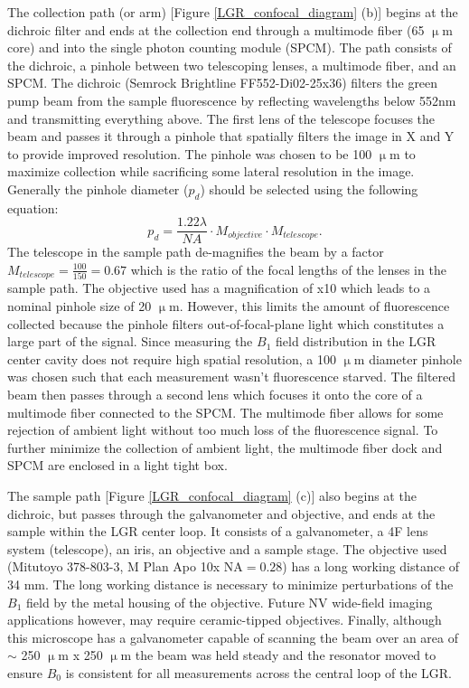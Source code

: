 The collection path (or arm) [Figure \ref{LGR_confocal_diagram} (b)] begins at the dichroic filter and ends at the collection end through a multimode fiber (65 $\upmu$m core) and into the single photon counting module (SPCM). The path consists of the dichroic, a pinhole between two telescoping lenses, a multimode fiber, and an SPCM. The dichroic (Semrock Brightline FF552-Di02-25x36) filters the green pump beam from the sample fluorescence by reflecting wavelengths below 552nm and transmitting everything above. The first lens of the telescope focuses the beam and passes it through a pinhole that spatially filters the image in X and Y to provide  improved resolution. The pinhole was chosen to be 100 $\upmu$m to maximize collection while sacrificing some lateral resolution in the image. Generally the pinhole diameter ($p_d$) should be selected using the following equation:
\begin{equation}
p_d = \frac{1.22 \lambda}{NA} \cdot M_{objective} \cdot M_{telescope}. 
\end{equation}
The telescope in the sample path de-magnifies the beam by a factor $M_{telescope} = \frac{100}{150} = 0.67$ which is the ratio of the focal lengths of the lenses in the sample path. The objective used has a magnification of x10 which leads to a nominal pinhole size of 20 $\upmu$m. However, this limits the amount of fluorescence collected because the pinhole filters out-of-focal-plane light which constitutes a large part of the signal. Since measuring the $B_1$ field distribution in the LGR center cavity does not require high spatial resolution, a 100 $\upmu$m diameter pinhole was chosen such that each measurement wasn't fluorescence starved. The filtered beam then passes through a second lens which focuses it onto the core of a multimode fiber connected to the SPCM. The multimode fiber allows for some rejection of ambient light without too much loss of the fluorescence signal. To further minimize the collection of ambient light, the multimode fiber dock and SPCM are enclosed in a light tight box. 

The sample path [Figure \ref{LGR_confocal_diagram} (c)] also begins at the dichroic, but passes through the galvanometer and objective, and ends at the sample within the LGR center loop. It consists of a galvanometer, a 4F lens system (telescope), an iris, an objective and a sample stage. The objective used (Mitutoyo 378-803-3, M Plan Apo 10x $\text{NA}=0.28$) has a long working distance of 34 mm. The long working distance is necessary to minimize perturbations of the $B_1$ field by the metal housing of the objective. Future NV wide-field imaging applications however, may require ceramic-tipped objectives. Finally, although this microscope has a galvanometer capable of scanning the beam over an area of $\sim$ 250 $\upmu$m x 250 $\upmu$m the beam was held steady and the resonator moved to ensure $B_0$ is consistent for all measurements across the central loop of the LGR.


